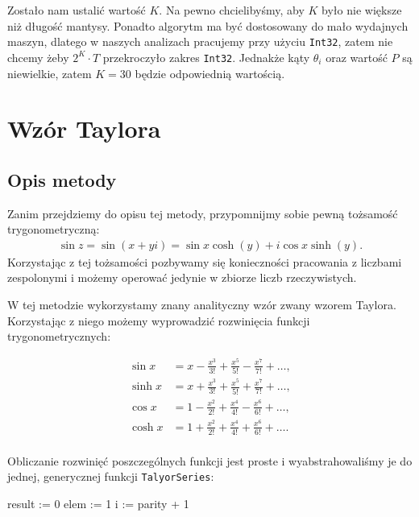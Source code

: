 \documentclass{mwart}
\theoremstyle{remark}
\theoremstyle{definition}
\theoremstyle{definition}
\begin{document}
Zostało nam ustalić wartość $K$. Na pewno chcielibyśmy, aby $K$ było nie większe niż
długość mantysy. Ponadto algorytm ma być dostosowany do mało wydajnych maszyn, dlatego
w naszych analizach pracujemy przy użyciu \texttt{Int32}, zatem nie chcemy żeby $2^K\cdot T$ przekroczyło
zakres \texttt{Int32}. Jednakże kąty $\theta_i$ oraz wartość $P$ są niewielkie, zatem $K = 30$ będzie
odpowiednią wartością.

\section{Wzór Taylora}
\subsection{Opis metody}
Zanim przejdziemy do opisu tej metody, przypomnijmy sobie pewną tożsamość trygonometryczną:
\begin{align}
  \sin z = \sin (x + yi) = \sin x\cosh (y) + i\cos x\sinh(y).
\end{align}
Korzystając z tej tożsamości pozbywamy się konieczności pracowania z liczbami zespolonymi i możemy operować jedynie w zbiorze liczb rzeczywistych.

W tej metodzie wykorzystamy znany analityczny wzór zwany wzorem Taylora. Korzystając z niego możemy wyprowadzić rozwinięcia funkcji trygonometrycznych:

\begin{align*}
  \sin x  & = x - \frac{x^3}{3!} + \frac{x^5}{5!} - \frac{x^7}{7!} + \ldots, \\
  \sinh x & = x + \frac{x^3}{3!} + \frac{x^5}{5!} + \frac{x^7}{7!} + \ldots, \\
  \cos x  & = 1 - \frac{x^2}{2!} + \frac{x^4}{4!} - \frac{x^6}{6!} + \ldots, \\
  \cosh x & = 1 + \frac{x^2}{2!} + \frac{x^4}{4!} + \frac{x^6}{6!} + \ldots. \\
\end{align*}

Obliczanie rozwinięć poszczególnych funkcji jest proste i wyabstrahowaliśmy je do jednej, generycznej funkcji \texttt{TalyorSeries}:
\begin{center}
  \begin{algorithm}[H]
    \SetAlgoLined
    result := 0\;
    elem := 1\;
    i := parity + 1\;
  \end{algorithm}
\end{center}
\end{document}
